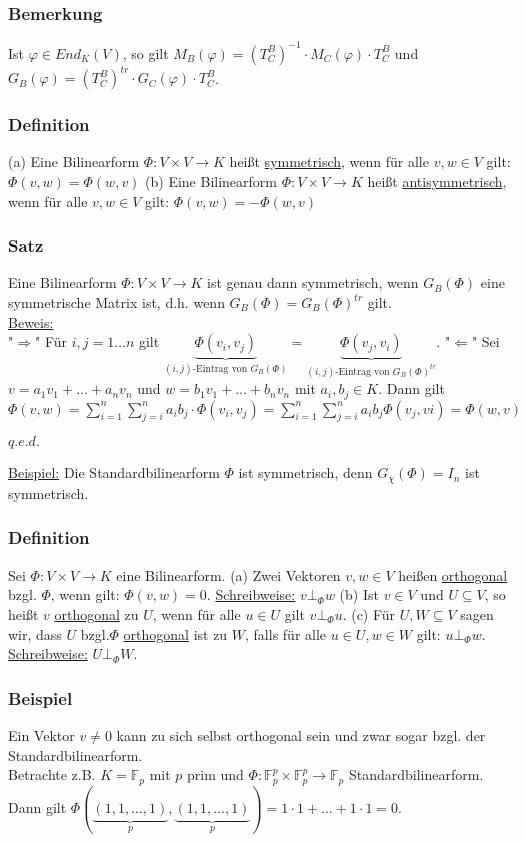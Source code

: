 \documentclass[a4paper]{article}
\newcommand{\ul}{\underline}
\renewcommand{\proof}{\ul{Beweis:}\\}
\renewcommand{\qed}{\begin{flushright}
\ul{\(q.e.d.\)}
\end{flushright}}
\let\phi\varphi
\begin{document}
\subsubsection{Bemerkung}
Ist \(\phi\in End_K(V) \), so gilt \(M_B(\phi)=(T_C^B)^{-1}\cdot M_C(\phi)\cdot T_C^B\) und \(G_B(\phi)=(T_C^B)^{tr}\cdot G_C(\phi)\cdot T_C^B\).
\subsubsection{Definition}
(a) Eine Bilinearform \(\Phi:V\times V\rightarrow K\) heißt \ul{symmetrisch}, wenn für alle \(v,w\in V\) gilt: \(\Phi(v,w)=\Phi(w,v)\)
(b) Eine Bilinearform \(\Phi:V\times V\rightarrow K\) heißt \ul{antisymmetrisch}, wenn für alle \(v,w\in V\) gilt: \(\Phi(v,w)=-\Phi(w,v)\)
\subsubsection{Satz}
Eine Bilinearform \(\Phi:V\times V\rightarrow K\) ist genau dann symmetrisch, wenn \(G_B(\Phi)\) eine symmetrische Matrix ist, d.h. wenn \(G_B(\Phi)=G_B(\Phi)^{tr}\) gilt.\\
\proof
"\(\Rightarrow\)" Für \(i,j=1\dots n\) gilt \(\underbrace{\Phi(v_i,v_j)}_{(i,j)\text{-Eintrag von } G_B(\Phi)}=\underbrace{\Phi(v_j,v_i)}_{(i,j)\text{-Eintrag von } G_B(\Phi)^{tr}}\).
"\(\Leftarrow\)" Sei \(v=a_1v_1+\dots+a_nv_n\) und \(w=b_1v_1+\dots+b_nv_n\) mit \(a_i,b_j\in K\). Dann gilt \(\Phi(v,w)=\sum_{i=1}^{n}\sum_{j=i}^{n}a_ib_j\cdot\Phi(v_i,v_j)=\sum_{i=1}^{n}\sum_{j=i}^{n}a_ib_j\Phi(v_j,vi)=\Phi(w,v)\)
\qed
\ul{Beispiel:} Die Standardbilinearform \(\Phi\) ist symmetrisch, denn \(G_\chi(\Phi)=I_n\) ist symmetrisch.
\subsubsection{Definition}
Sei \(\Phi:V\times V\rightarrow K\) eine Bilinearform.
(a) Zwei Vektoren \(v,w\in V\) heißen \ul{orthogonal} bzgl. \(\Phi\), wenn gilt: \(\Phi(v,w)=0\). \ul{Schreibweise:} \(v\bot_\Phi w\)
(b) Ist \(v\in V\) und \(U\subseteq V\), so heißt \(v\) \ul{orthogonal} zu \(U\), wenn für alle \(u\in U\) gilt \(v\bot_\Phi u\).
(c) Für \(U,W\subseteq V\) sagen wir, dass \(U\) bzgl.\(\Phi\) \ul{orthogonal} ist zu \(W\), falls für alle \(u\in U, w\in W\) gilt: \(u\bot_\Phi w\). \ul{Schreibweise:} \(U\bot_\Phi W\).
\subsubsection{Beispiel}
Ein Vektor \(v\neq 0\) kann zu sich selbst orthogonal sein und zwar sogar bzgl. der Standardbilinearform.\\
Betrachte z.B. \(K=\mathbb{F}_p\) mit \(p\) prim und \(\Phi:\mathbb{F}_p^p\times \mathbb{F}_p^p\rightarrow \mathbb{F}_p\) Standardbilinearform. Dann gilt \(\Phi(\underbrace{(1,1,\dots,1)}_{p},\underbrace{(1,1,\dots,1)}_{p})=1\cdot 1+\dots+1\cdot 1=0\).
\end{document}
